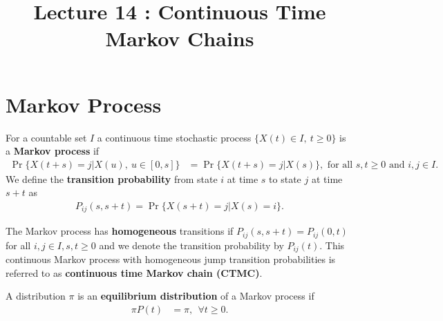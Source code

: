 \documentclass[a4paper,10pt,english]{article}
\title{Lecture 14 : Continuous Time Markov Chains}
\author{}
\begin{document}
\maketitle

\section{Markov Process}
\begin{defn}
For a countable set $I$ a continuous time stochastic process $\{X(t) \in I, ~ t \geqslant 0\}$ is a \textbf{Markov process} if
\begin{align*}
\Pr\{X(t+s) = j |X(u),~ u \in [0,s]\} &= \Pr\{X(t+s) = j |X(s)\}, \text{ for all } s, t \geqslant 0 \text{ and } i, j \in I.
\end{align*}
We define the \textbf{transition probability} from state $i$ at time $s$ to state $j$ at time $s+t$ as 
\begin{align*}
P_{ij}(s, s+t) = \Pr\{X(s+t) = j | X(s) = i\}.
\end{align*}
\end{defn}
\begin{defn}
The Markov process has \textbf{homogeneous} transitions if $P_{ij}(s,s+t) = P_{ij}(0,t)$ for all $i,j \in I, s,t \geqslant 0$ and we denote the transition probability by $P_{ij}(t)$. 
This continuous Markov process with homogeneous jump transition probabilities is referred to as \textbf{continuous time Markov chain (CTMC)}. 
\end{defn}
\begin{defn}
A distribution $\pi$ is an \textbf{equilibrium distribution} of a Markov process if
\begin{align*}
\pi P(t) &= \pi,~~ \forall t \geqslant 0. 
\end{align*}
\end{defn}
\end{document}
